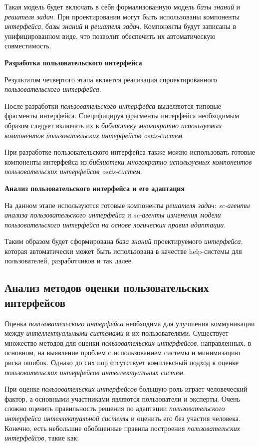 Такая модель будет включать в себя формализованную модель \textit{базы знаний} и \textit{решателя задач}. При проектировании могут быть использованы компоненты \textit{интерфейса}, \textit{базы знаний} и \textit{решателя задач}. Компоненты будут записаны в унифицированном виде, что позволит обеспечить их автоматическую совместимость.

\textbf{Разработка пользовательского интерфейса}

Результатом четвертого этапа является реализация спроектированного \textit{пользовательского интерфейса}. 

После разработки \textit{пользовательского интерфейса} выделяются типовые фрагменты интерфейса. Специфицируя фрагменты интерфейса необходимым образом следует включать их в \textit{библиотеку многократно используемых компонентов пользовательских интерфейсов ostis-систем}.

При разработке пользовательского интерфейса также можно использовать готовые компоненты интерфейса из \textit{библиотеки многократно используемых компонентов пользовательских интерфейсов ostis-систем}.

\textbf{Анализ пользовательского интерфейса и его адаптация}

На данном этапе используются готовые компоненты \textit{решателя задач}: \textit{sc-агенты анализа пользовательского интерфейса} и \textit{sc-агенты изменения модели пользовательского интерфейса на основе логических правил адаптации}.

Таким образом будет сформирована \textit{база знаний} проектируемого \textit{интерфейса}, которая автоматически может быть использована в качестве help-системы для пользователей, разработчиков и так далее.

\subsection{Анализ методов оценки пользовательских интерфейсов}
\label{sec_UI_analisys}

 Оценка \textit{пользовательского интерфейса} необходима для улучшения коммуникации между \textit{интеллектуальными системами} и их пользователями. Существует множество методов для оценки \textit{пользовательских интерфейсов}, направленных, в основном, на выявление проблем с использованием системы и минимизацию риска ошибок. Однако до сих пор отсутствует комплексный подход к оценке \textit{пользовательских интерфейсов интеллектуальных систем}.

При оценке \textit{пользовательских интерфейсов} большую роль играет человеческий фактор, а основными участниками являются пользователи и эксперты. Очень сложно оценить правильность решения по адаптации \textit{пользовательского интерфейса интеллектуальной системы} и оценить его без участия человека. Конечно, есть небольшие обобщенные правила построения \textit{пользовательских интерфейсов}, такие как:

